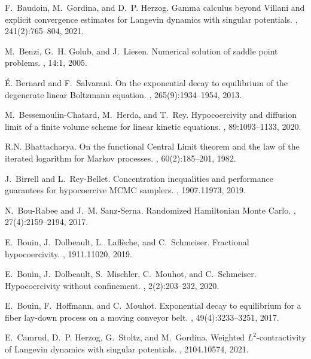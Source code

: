 \documentclass{article}
\begin{document}
\begin{thebibliography}{10}
F.~Baudoin, M.~Gordina, and D.~P. Herzog.
\newblock Gamma calculus beyond {V}illani and explicit convergence estimates
  for {L}angevin dynamics with singular potentials.
, 241(2):765--804, 2021.

M.~Benzi, G.~H. Golub, and J.~Liesen.
\newblock Numerical solution of saddle point problems.
, 14:1, 2005.

\'{E}. Bernard and F.~Salvarani.
\newblock On the exponential decay to equilibrium of the degenerate linear
  {B}oltzmann equation.
, 265(9):1934--1954, 2013.

M.~Bessemoulin-Chatard, M.~Herda, and T.~Rey.
\newblock Hypocoercivity and diffusion limit of a finite volume scheme for
  linear kinetic equations.
, 89:1093--1133, 2020.

R.N. Bhattacharya.
\newblock On the functional {C}entral {L}imit theorem and the law of the
  iterated logarithm for {M}arkov processes.
, 60(2):185--201, 1982.

J.~Birrell and L.~Rey-Bellet.
\newblock Concentration inequalities and performance guarantees for
  hypocoercive {MCMC} samplers.
, 1907.11973, 2019.

N.~Bou-Rabee and J.~M. Sanz-Serna.
\newblock Randomized {H}amiltonian {M}onte {C}arlo.
, 27(4):2159--2194, 2017.

E.~Bouin, J.~Dolbeault, L.~Lafl{\`e}che, and C.~Schmeiser.
\newblock Fractional hypocoercivity.
, 1911.11020, 2019.

E.~Bouin, J.~Dolbeault, S.~Mischler, C.~Mouhot, and C.~Schmeiser.
\newblock Hypocoercivity without confinement.
, 2(2):203--232, 2020.

E.~Bouin, F.~Hoffmann, and C.~Mouhot.
\newblock Exponential decay to equilibrium for a fiber lay-down process on a
  moving conveyor belt.
, 49(4):3233--3251, 2017.

E.~Camrud, D.~P. Herzog, G.~Stoltz, and M.~Gordina.
\newblock Weighted {$L^2$}-contractivity of {L}angevin dynamics with singular
  potentials.
, 2104.10574, 2021.


\end{thebibliography}
\end{document}
